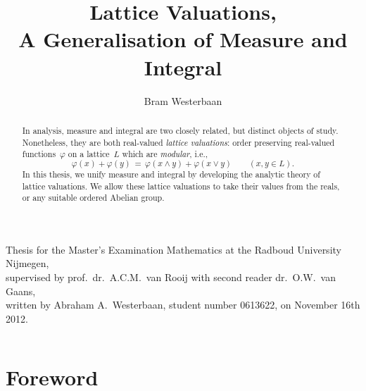 \documentclass[main.tex]{subfiles}
\begin{document}
\title[A Generalisation of Measure and Integral]{Lattice Valuations,\\
A Generalisation of Measure and Integral}

\author[A.A.~Westerbaan]{Bram Westerbaan}
\maketitle


\vspace{1cm}


\vfill
\noindent
{\tiny
Thesis for the Master's Examination
Mathematics at the Radboud University Nijmegen,\\
supervised by prof.~dr.~A.C.M.~van Rooij
with second reader dr.~O.W.~van Gaans,\\
written by Abraham A.~Westerbaan, 
student number 0613622,
on November 16th 2012.

}
\clearpage
$\,$
\newpage
\begin{abstract}
In analysis,
measure and integral are two closely related,
but distinct objects of study.
Nonetheless,
they are both real-valued \emph{lattice valuations}:
order preserving real-valued functions~$\varphi$
on a lattice~$L$
which are \emph{modular}, i.e.,
\begin{equation*}
\varphi(x) + \varphi(y) 
\,=\, 
\varphi(x\wedge y) + \varphi(x\vee y)\qquad(x,y\in L).
\end{equation*}
In this thesis,
we unify measure and integral
by developing the analytic theory of lattice valuations.
We allow these lattice valuations
to take their values from the reals,
or any suitable ordered Abelian group.
\end{abstract}

\clearpage
%
%
\section*{Foreword}
\clearpage
\tableofcontents
\clearpage
\end{document}
